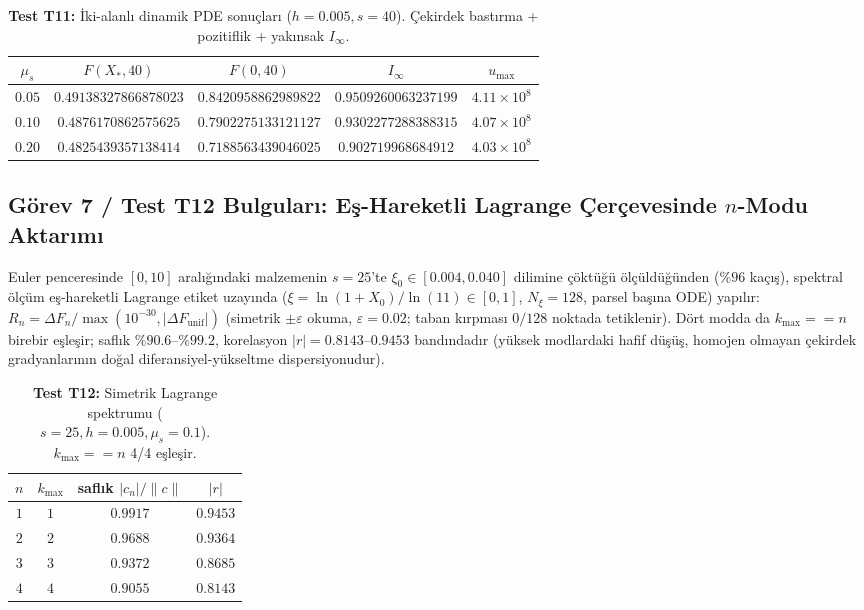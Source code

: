 \documentclass[12pt,a4paper]{article}
\begin{document}
\begin{table}[htbp]
\centering
\footnotesize
\setlength{\tabcolsep}{2pt}
\caption{\textbf{Test T11:} İki-alanlı dinamik PDE sonuçları ($h=0.005, s=40$). Çekirdek bastırma + pozitiflik + yakınsak $I_\infty$.}
\vspace{0.1cm}
\begin{tabular}{@{}c|cc|c|c@{}}
\hline
$\mu_s$ & $F(X_*,40)$ & $F(0,40)$ & $I_{\infty}$ & $u_{\max}$ \\
\hline
$0.05$ & $0.49138327866878023$ & $0.8420958862989822$ & $0.9509260063237199$ & $4.11\times 10^{8}$ \\
$0.10$ & $0.4876170862575625$ & $0.7902275133121127$ & $0.9302277288388315$ & $4.07\times 10^{8}$ \\
$0.20$ & $0.4825439357138414$ & $0.7188563439046025$ & $0.902719968684912$ & $4.03\times 10^{8}$ \\
\hline
\end{tabular}
\end{table}

\subsection{Görev 7 / Test T12 Bulguları: Eş-Hareketli Lagrange Çerçevesinde $n$-Modu Aktarımı}

Euler penceresinde $[0, 10]$ aralığındaki malzemenin $s = 25$'te $\xi_0 \in [0.004, 0.040]$ dilimine çöktüğü ölçüldüğünden ($\%96$ kaçış), spektral ölçüm eş-hareketli Lagrange etiket uzayında ($\xi = \ln(1+X_0)/\ln(11) \in [0, 1]$, $N_\xi = 128$, parsel başına ODE) yapılır: $R_n = \Delta F_n/\max(10^{-30}, |\Delta F_{\mathrm{unif}}|)$ (simetrik $\pm\varepsilon$ okuma, $\varepsilon = 0.02$; taban kırpması $0/128$ noktada tetiklenir). Dört modda da $k_{\max} == n$ birebir eşleşir; saflık $\%90.6\text{--}\%99.2$, korelasyon $|r| = 0.8143\text{--}0.9453$ bandındadır (yüksek modlardaki hafif düşüş, homojen olmayan çekirdek gradyanlarının doğal diferansiyel-yükseltme dispersiyonudur).

\begin{table}[htbp]
\centering
\footnotesize
\setlength{\tabcolsep}{4pt}
\caption{\textbf{Test T12:} Simetrik Lagrange spektrumu ($s=25, h=0.005, \mu_s=0.1$). $k_{\max}==n$ 4/4 eşleşir.}
\vspace{0.1cm}
\begin{tabular}{@{}c|c|c|c@{}}
\hline
$n$ & $k_{\max}$ & saflık $|c_n|/\|c\|$ & $|r|$ \\
\hline
$1$ & $1$ & $0.9917$ & $0.9453$ \\
$2$ & $2$ & $0.9688$ & $0.9364$ \\
$3$ & $3$ & $0.9372$ & $0.8685$ \\
$4$ & $4$ & $0.9055$ & $0.8143$ \\
\hline
\end{tabular}
\end{table}
\end{document}
